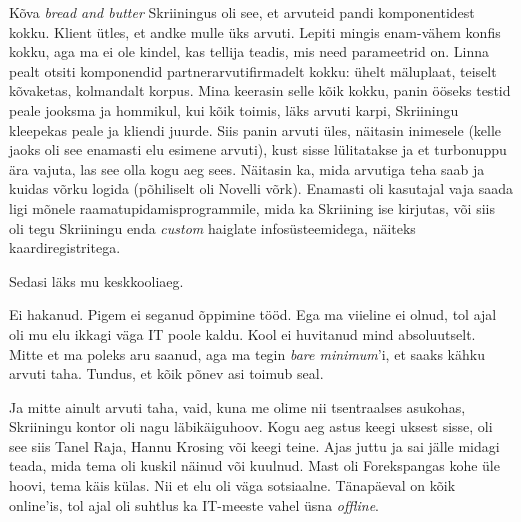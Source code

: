 Kõva \emph{bread and butter} Skriiningus oli see, et arvuteid pandi 
komponentidest kokku. Klient ütles, et andke mulle üks arvuti. Lepiti 
mingis enam-vähem konfis kokku, aga ma ei ole kindel, kas
tellija teadis, mis need parameetrid on. Linna pealt otsiti komponendid 
partnerarvutifirmadelt kokku: ühelt mäluplaat, teiselt kõvaketas, 
kolmandalt korpus. Mina keerasin selle kõik kokku, panin ööseks 
testid peale jooksma ja hommikul, kui kõik toimis, läks arvuti karpi, Skriiningu 
kleepekas peale ja kliendi juurde. Siis panin arvuti üles, näitasin inimesele (kelle 
jaoks oli see enamasti elu esimene arvuti), kust sisse 
lülitatakse ja et turbonuppu ära vajuta, las see olla kogu aeg sees. Näitasin ka, mida arvutiga teha saab ja kuidas 
võrku logida (põhiliselt oli Novelli võrk). Enamasti oli 
kasutajal vaja saada ligi mõnele raamatupidamisprogrammile, mida ka 
Skriining ise kirjutas, või siis oli tegu Skriiningu enda \emph{custom} 
haiglate infosüsteemidega, näiteks kaardiregistritega.

Sedasi läks mu keskkooliaeg. 


Ei hakanud. Pigem ei seganud õppimine tööd. Ega ma viieline ei 
olnud, tol ajal oli mu elu ikkagi väga IT poole kaldu. 
Kool ei huvitanud mind absoluutselt. Mitte et ma poleks
aru saanud, aga ma tegin \emph{bare minimum}'i, et saaks kähku arvuti taha. Tundus, et 
kõik põnev asi toimub seal. 

Ja mitte ainult arvuti taha, vaid, kuna me olime nii tsentraalses asukohas, 
Skriiningu kontor oli nagu läbikäiguhoov. Kogu aeg astus keegi uksest 
sisse, oli see siis Tanel Raja, Hannu 
Krosing või keegi teine. Ajas juttu ja sai jälle 
midagi teada, mida tema oli kuskil näinud või kuulnud. Mast oli Forekspangas kohe üle hoovi, tema käis külas. Nii et elu oli väga 
sotsiaalne. Tänapäeval on kõik online'is, tol 
ajal oli suhtlus ka IT-meeste vahel üsna \emph{offline}. 


